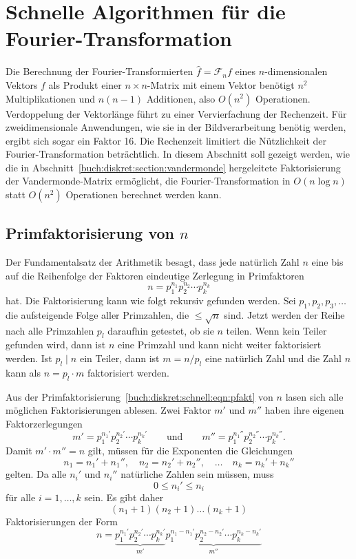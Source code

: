 %
%
%
\section{Schnelle Algorithmen für die Fourier-Transformation
\label{buch:diskret:section:schnell}}
Die Berechnung der Fourier-Transformierten $\hat{f}=\mathscr{F}_nf$ eines
$n$-dimensionalen Vektors $f$ als Produkt einer $n\times n$-Matrix mit
einem Vektor benötigt $n^2$ Multiplikationen und $n(n-1)$ Additionen,
also $O(n^2)$ Operationen.
Verdoppelung der Vektorlänge führt zu einer Vervierfachung der Rechenzeit.
Für zweidimensionale Anwendungen, wie sie in der Bildverarbeitung
benötig werden, ergibt sich sogar ein Faktor 16.
Die Rechenzeit limitiert die Nützlichkeit der Fourier-Transformation
beträchtlich.
In diesem Abschnitt soll gezeigt werden, wie die in
Abschnitt~\ref{buch:diskret:section:vandermonde} hergeleitete
Faktorisierung der Vandermonde-Matrix ermöglicht, die Fourier-Transformation
in $O(n\log n)$ statt $O(n^2)$ Operationen berechnet werden kann.

%
%
\subsection{Primfaktorisierung von $n$
\label{buch:diskret:schnell:subsection:primfaktorisierung}}
Der Fundamentalsatz der Arithmetik besagt, dass jede natürlich Zahl $n$
eine bis auf die Reihenfolge der Faktoren eindeutige Zerlegung in
Primfaktoren
\begin{equation}
n = p_1^{n_1} p_2^{n_2} \cdots p_k^{n_k}
\label{buch:diskret:schnell:eqn:pfakt}
\end{equation}
hat.
Die Faktorisierung kann wie folgt rekursiv gefunden werden.
Sei $p_1,p_2,p_3,\dots$ die aufsteigende Folge aller Primzahlen, die
$\le \!\sqrt{n}$ sind.
Jetzt werden der Reihe nach alle Primzahlen $p_l$ daraufhin getestet,
ob sie $n$ teilen.
Wenn kein Teiler gefunden wird, dann ist $n$ eine Primzahl und kann
nicht weiter faktorisiert werden.
Ist $p_l\mid n$ ein Teiler, dann ist $m=n/p_l$ eine natürlich Zahl
und die Zahl $n$ kann als $n=p_l\cdot m$ faktorisiert werden.

Aus der Primfaktorisierung~\eqref{buch:diskret:schnell:eqn:pfakt}
von $n$ lasen sich alle möglichen Faktorisierungen ablesen.
Zwei Faktor $m'$ und $m''$ haben ihre eigenen Faktorzerlegungen
\[
m'= p_1^{n_1'}p_2^{n_2'}\cdots p_k^{n_k'}
\qquad\text{und}\qquad
m''= p_1^{n_1''}p_2^{n_2''}\cdots p_k^{n_k''}.
\]
Damit $m'\cdot m''=n$ gilt, müssen für die Exponenten die Gleichungen
\[
n_1=n_1'+n_1'',\quad
n_2=n_2'+n_2'',\quad\dots\quad
n_k=n_k'+n_k''
\]
gelten.
Da alle $n_i'$ und $n_i''$ natürliche Zahlen sein müssen, muss
\[
0\le n_i'\le n_i
\]
für alle $i=1,\dots,k$ sein.
Es gibt daher
\[
(n_1+1)(n_2+1)\dots(n_k+1)
\]
Faktorisierungen der Form
\[
n
=
\underbrace{
p_1^{n_1'}p_2^{n_2'}\cdots p_k^{n_k'}
}_{\displaystyle m'}
\underbrace{
p_1^{n_1-n_1'}p_2^{n_2-n_2'}\cdots p_k^{n_k-n_k'}
}_{\displaystyle m''}
\]

